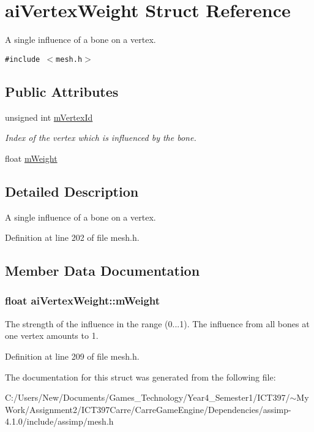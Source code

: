 \hypertarget{structai_vertex_weight}{
\section{aiVertexWeight Struct Reference}
\label{structai_vertex_weight}
}
A single influence of a bone on a vertex.  


{\tt \#include $<$mesh.h$>$}

\subsection*{Public Attributes}
\begin{CompactItemize}
\item 
\hypertarget{structai_vertex_weight_f6269cf6a0f02e5ae870a72046d58f4f}{
unsigned int \hyperlink{structai_vertex_weight_f6269cf6a0f02e5ae870a72046d58f4f}{mVertexId}}
\label{structai_vertex_weight_f6269cf6a0f02e5ae870a72046d58f4f}

\begin{CompactList}\small\item\em Index of the vertex which is influenced by the bone. \item\end{CompactList}\item 
float \hyperlink{structai_vertex_weight_bab9c49baabc2cafef9ac840f59e61b8}{mWeight}
\end{CompactItemize}


\subsection{Detailed Description}
A single influence of a bone on a vertex. 

Definition at line 202 of file mesh.h.

\subsection{Member Data Documentation}
\hypertarget{structai_vertex_weight_bab9c49baabc2cafef9ac840f59e61b8}{
\subsubsection[mWeight]{\setlength{\rightskip}{0pt plus 5cm}float {\bf aiVertexWeight::mWeight}}}
\label{structai_vertex_weight_bab9c49baabc2cafef9ac840f59e61b8}


The strength of the influence in the range (0...1). The influence from all bones at one vertex amounts to 1. 

Definition at line 209 of file mesh.h.

The documentation for this struct was generated from the following file:\begin{CompactItemize}
\item 
C:/Users/New/Documents/Games\_\-Technology/Year4\_\-Semester1/ICT397/$\sim$My Work/Assignment2/ICT397Carre/CarreGameEngine/Dependencies/assimp-4.1.0/include/assimp/mesh.h\end{CompactItemize}
